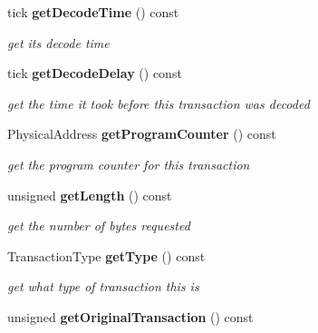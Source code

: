 \begin{DoxyCompactItemize}
\item 
tick {\bf getDecodeTime} () const \label{class_d_r_a_msim_i_i_1_1_transaction_a6f3ffd616ea2ac0a57c00c870c3ed7c7}

\begin{DoxyCompactList}\small\item\em get its decode time \item\end{DoxyCompactList}\item 
tick {\bf getDecodeDelay} () const \label{class_d_r_a_msim_i_i_1_1_transaction_a9150a5afae5893e9ccd1b05b396aeea0}

\begin{DoxyCompactList}\small\item\em get the time it took before this transaction was decoded \item\end{DoxyCompactList}\item 
PhysicalAddress {\bf getProgramCounter} () const \label{class_d_r_a_msim_i_i_1_1_transaction_a4062ffc918d35c057ebc6b03fe0be3ba}

\begin{DoxyCompactList}\small\item\em get the program counter for this transaction \item\end{DoxyCompactList}\item 
unsigned {\bf getLength} () const \label{class_d_r_a_msim_i_i_1_1_transaction_a92b4de22f19d5d659f236f40f442801d}

\begin{DoxyCompactList}\small\item\em get the number of bytes requested \item\end{DoxyCompactList}\item 
TransactionType {\bf getType} () const \label{class_d_r_a_msim_i_i_1_1_transaction_af8a03aa94ca2d4e196d54c5ca46d0e1a}

\begin{DoxyCompactList}\small\item\em get what type of transaction this is \item\end{DoxyCompactList}\item 
unsigned {\bf getOriginalTransaction} () const \label{class_d_r_a_msim_i_i_1_1_transaction_ae7a386db95dd3b642b05029d7002a401}


\end{DoxyCompactItemize}
